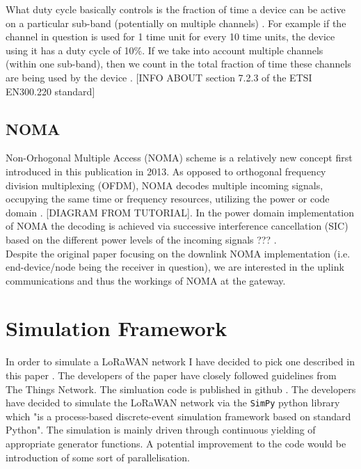 What duty cycle basically controls is the fraction of time a device can be active on a particular sub-band (potentially on multiple channels) \cite{duty_cycle}. For example if the channel in 
question is used for 1 time unit for every 10 time units,
the device using it has a duty cycle of 10\%. If we take into account multiple channels (within one sub-band), then we count in the total fraction of time these channels are being used by the device \cite{duty_cycle}. [INFO ABOUT section 7.2.3 of the ETSI EN300.220 standard]

\section{NOMA}
 
 Non-Orhogonal Multiple Access (NOMA) scheme is a relatively new concept first introduced in this publication \cite{noma_original} in 2013. As opposed to orthogonal
frequency division multiplexing (OFDM), NOMA decodes multiple incoming signals, occupying the same time 
or frequency resources, utilizing the power or code domain \cite{noma_imperial}. [DIAGRAM FROM TUTORIAL]. In the power domain implementation of NOMA the decoding is achieved via successive interference cancellation (SIC) based on the 
different power levels of the incoming signals \cite{noma_imperial} \cite{noma_original} ??? .\\ 

Despite the original paper \cite{noma_original} focusing on the downlink NOMA
implementation (i.e. end-device/node being the receiver in question), we are interested in the uplink communications and thus the workings of NOMA at the gateway. 
  
 
 
\chapter{Simulation Framework}

In order to simulate a LoRaWAN network I have decided to pick one described in this paper \cite{simulator}. The developers of the paper have closely followed guidelines from The Things Network. The simluation code is published in github \cite{simulator_github}. The developers have decided to simulate the LoRaWAN network via the \texttt{SimPy} python library which "is a process-based discrete-event simulation framework based on standard Python"\cite{simpy}. The simulation is mainly driven through continuous yielding of appropriate generator functions. A potential improvement to the code would be introduction of some sort of parallelisation.


